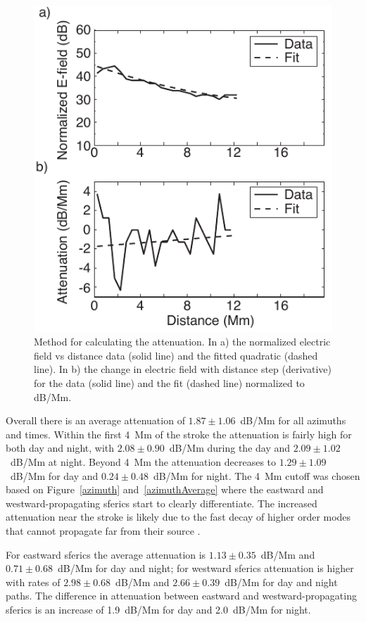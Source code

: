 \begin{figure}[h!t]
    \centering
    \includegraphics[scale=1]{Azimuth/Figures/attenuationCalculation.pdf} 
    \caption{Method for calculating the attenuation.
    	In a) the normalized electric field vs distance data (solid line) and the fitted quadratic (dashed line).
	In b) the change in electric field with distance step (derivative) for the data (solid line) and the fit (dashed line) normalized to dB/Mm.}
    \label{attenuationCalculation}
 \end{figure}

Overall there is an average attenuation of $1.87\pm1.06$~dB/Mm for all azimuths and times.
Within the first 4~Mm of the stroke the attenuation is fairly high for both day and night, with $2.08\pm0.90$~dB/Mm during the day and $2.09\pm1.02$~dB/Mm at night.
Beyond 4~Mm the attenuation decreases to $1.29\pm1.09$~dB/Mm for day and $0.24\pm0.48$~dB/Mm for night.
The 4~Mm cutoff was chosen based on Figure~\ref{azimuth} and~\ref{azimuthAverage} where the eastward and westward-propagating sferics start to clearly differentiate.
The increased attenuation near the stroke is likely due to the fast decay of higher order modes that cannot propagate far from their source \citep{Wait1970}.

For eastward sferics the average attenuation is $1.13\pm0.35$~dB/Mm and $0.71\pm0.68$~dB/Mm for day and night; for westward sferics attenuation is higher with rates of $2.98\pm0.68$~dB/Mm and $2.66\pm0.39$~dB/Mm for day and night paths.
The difference in attenuation between eastward and westward-propagating sferics is an increase of  1.9~dB/Mm for day and 2.0~dB/Mm for night.
  
